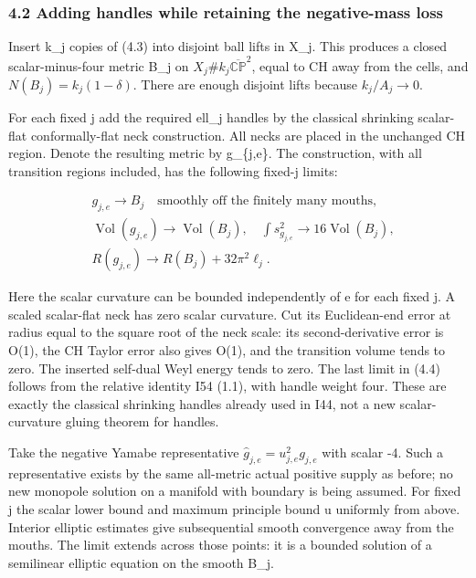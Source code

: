 \documentclass[
  10pt,
]{article}
\begin{document}
\hypertarget{adding-handles-while-retaining-the-negative-mass-loss}{%
\subsubsection{4.2 Adding handles while retaining the negative-mass
loss}\label{adding-handles-while-retaining-the-negative-mass-loss}}

Insert k\_j copies of (4.3) into disjoint ball lifts in X\_j. This
produces a closed scalar-minus-four metric B\_j on
\(X_j\#k_j\overline{\mathbb{CP}}^2\), equal to CH away from the cells,
and \(N(B_j)=k_j(1-\delta)\). There are enough disjoint lifts because
\(k_j/A_j\to0\).

For each fixed j add the required ell\_j handles by the classical
shrinking scalar-flat conformally-flat neck construction. All necks are
placed in the unchanged CH region. Denote the resulting metric by
g\_\{j,e\}. The construction, with all transition regions included, has
the following fixed-j limits:

\[
 \begin{aligned}
 &g_{j,e}\longrightarrow B_j\quad\text{smoothly off the finitely many mouths},\\
 &\operatorname{Vol}(g_{j,e})\longrightarrow\operatorname{Vol}(B_j),
 \quad\int s_{g_{j,e}}^2\longrightarrow16\operatorname{Vol}(B_j),\\
 &R(g_{j,e})\longrightarrow R(B_j)+32\pi^2\ell_j.
 \end{aligned} \tag{4.4}
\]

Here the scalar curvature can be bounded independently of e for each
fixed j. A scaled scalar-flat neck has zero scalar curvature. Cut its
Euclidean-end error at radius equal to the square root of the neck
scale: its second-derivative error is O(1), the CH Taylor error also
gives O(1), and the transition volume tends to zero. The inserted
self-dual Weyl energy tends to zero. The last limit in (4.4) follows
from the relative identity I54 (1.1), with handle weight four. These are
exactly the classical shrinking handles already used in I44, not a new
scalar-curvature gluing theorem for handles.

Take the negative Yamabe representative
\(\widehat g_{j,e}=u_{j,e}^2g_{j,e}\) with scalar -4. Such a
representative exists by the same all-metric actual positive supply as
before; no new monopole solution on a manifold with boundary is being
assumed. For fixed j the scalar lower bound and maximum principle bound
u uniformly from above. Interior elliptic estimates give subsequential
smooth convergence away from the mouths. The limit extends across those
points: it is a bounded solution of a semilinear elliptic equation on
the smooth B\_j.
\end{document}
